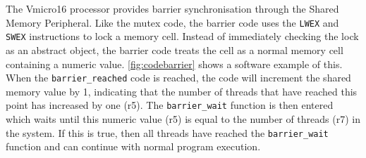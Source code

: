 The Vmicro16 processor provides barrier synchronisation through the Shared Memory Peripheral. Like the mutex code, the barrier code uses the \verb|LWEX| and \verb|SWEX| instructions to lock a memory cell. Instead of immediately checking the lock as an abstract object, the barrier code treats the cell as a normal memory cell containing a numeric value. \cref{fig:codebarrier} shows a software example of this. When the \verb|barrier_reached| code is reached, the code will increment the shared memory value by 1, indicating that the number of threads that have reached this point has increased by one (r5). The \verb|barrier_wait| function is then entered which waits until this numeric value (r5) is equal to the number of threads (r7) in the system. If this is true, then all threads have reached the \verb|barrier_wait| function and can continue with normal program execution.








